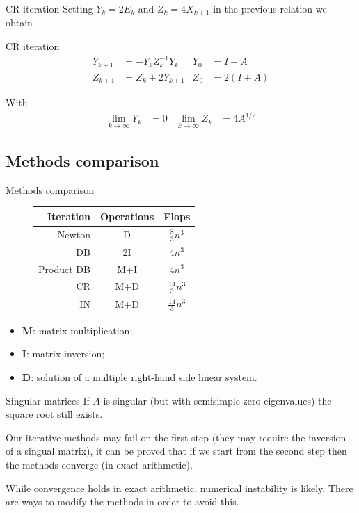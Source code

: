 \documentclass{beamer}
\theoremstyle{plain}
\theoremstyle{definition}
\theoremstyle{remark}
\begin{document}
\begin{frame}{CR iteration}
  Setting $Y_k = 2E_k$ and $Z_k = 4X_{k+1}$ in the previous relation
  we obtain
  \begin{block}{CR iteration}
    \begin{align*}
      Y_{k+1} &= -Y_kZ_k^{-1}Y_k & Y_0 &= I -A \\
      Z_{k+1} &= Z_k + 2Y_{k+1} & Z_0 &= 2(I+A)
    \end{align*}
  \end{block}
  With 
  \begin{align*}
    \lim _{k\to \infty} Y_k & = 0 & \lim _{k\to \infty} Z_k &=
                                                              4A^{1/2}
  \end{align*}
\end{frame}

\subsection{Methods comparison}

\begin{frame}{Methods comparison}
  \begin{figure}
    \begin{tabular}{ r | c c }
      Iteration & Operations & Flops \\
      \hline
      Newton & D & $\frac{8}{3}n^3$ \\
      DB & 2I & $4n^3$ \\
      Product DB & M+I & $4n^3$ \\
      CR & M+D & $\frac{14}{3}n^3$ \\
      IN & M+D & $\frac{14}{3}n^3$
    \end{tabular}
  \end{figure}
  \begin{itemize}
  \item \textbf{M}: matrix multiplication;
  \item \textbf{I}: matrix inversion;
  \item \textbf{D}: solution of a multiple right-hand side linear system.
  \end{itemize}
\end{frame}

\begin{frame}{Singular matrices}
  If $A$ is singular (but with semisimple zero eigenvalues) the square
  root still exists.

  Our iterative methods may fail on the first step (they may require
  the inversion of a singual matrix), it can be proved that if we
  start from the second step then the methods converge (in exact
  arithmetic).  \vfill
  
  While convergence holds in exact arithmetic, numerical instability
  is likely. There are ways to modify the methods in order to avoid
  this.
\end{frame}
\end{document}
